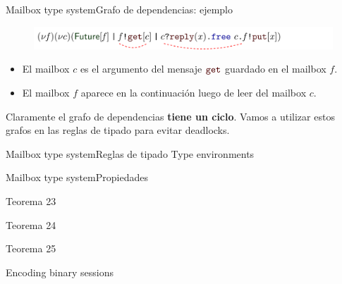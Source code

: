 \documentclass{beamer}
\newcommand{\msgtag}[1]{\texttt{\textcolor{msg-color}{#1}}}
\begin{document}
\begin{frame}{Mailbox type system}{Grafo de dependencias: ejemplo}
    \begin{figure}[H]
        \includegraphics[width=\textwidth]{dependency-graph-example}
    \end{figure}

    \begin{itemize}
        \item El mailbox $c$ es el argumento del mensaje $\msgtag{get}$ guardado en el mailbox $f$.
        \item El mailbox $f$ aparece en la continuación luego de leer del mailbox $c$.
    \end{itemize}

    \vspace{-1em}
    \begin{figure}
        \centering
    \end{figure}
    \vspace{-1em}

    Claramente el grafo de dependencias \textbf{tiene un ciclo}. Vamos a utilizar estos grafos en las reglas de tipado para evitar deadlocks.
\end{frame}

\begin{frame}{Mailbox type system}{Reglas de tipado}
    Type environments
\end{frame}

\begin{frame}{Mailbox type system}{Propiedades}
    \begin{block}{Teorema 23}
    \end{block}
    \begin{block}{Teorema 24}
    \end{block}
    \begin{block}{Teorema 25}
    \end{block}
\end{frame}

\begin{frame}{Encoding binary sessions}
\end{frame}
\end{document}
